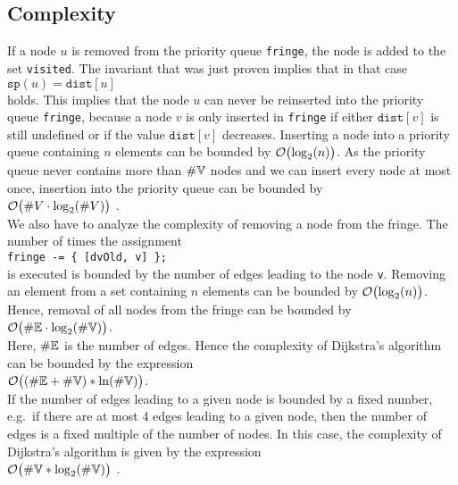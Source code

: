 \subsection{Complexity}
If a node $u$ is removed from the priority queue \texttt{fringe}, the node is added to the set
\texttt{visited}.  The invariant that was just proven implies that in that case
\\[0.2cm]
\hspace*{1.3cm}
$\texttt{sp}(u) = \texttt{dist}[u]$
\\[0.2cm]
holds.  This implies that the node $u$ can never be reinserted into the priority queue
\texttt{fringe}, because a node $v$ is only inserted in \texttt{fringe} if either 
 $\texttt{dist}[v]$ is still undefined or if  the  value $\texttt{dist}[v]$ decreases.  
Inserting a node into a priority queue containing  $n$ elements can be bounded by
$\mathcal{O}\bigl(\log_2(n)\bigr)$.  As the priority queue never contains more than $\#{\mathbb V}$ nodes and we
can insert every node at most once, insertion into the priority queue can be bounded by
\\[0.2cm]
\hspace*{1.3cm}
$\mathcal{O}\bigl(\#V \cdot \log_2(\#V)\bigr)$ .
\\[0.2cm]
We also have to analyze the complexity of removing a node from the fringe. 
The number of times the assignment
\\[0.2cm]
\hspace*{1.3cm}
\texttt{fringe -= \{ [dvOld, v] \};} 
\\[0.2cm]
is executed is bounded by the number of edges leading to the node \texttt{v}.
Removing an element from a set containing $n$ elements can be bounded by
 $\mathcal{O}\bigl(\log_2(n)\bigr)$.  Hence, removal of all nodes from the fringe can be bounded by
\\[0.2cm]
\hspace*{1.3cm}
$\mathcal{O}\bigl(\#{\mathbb E} \cdot \log_2(\#{\mathbb V})\bigr)$.
\\[0.2cm]
Here,  $\#{\mathbb E}$ is the number of edges.  Hence the complexity of Dijkstra's algorithm can be
bounded by the expression \\[0.2cm]
\hspace*{1.3cm} $\mathcal{O}\bigl((\#{\mathbb E} + \#{\mathbb V}) * \ln(\#{\mathbb V})\bigr)$. \\[0.2cm]
If the number of edges leading  to a given node is bounded by a fixed number, e.g.~if there
are at most 4 edges leading to a given node, then the number of edges is a fixed multiple of the
number of nodes.  In this case, the complexity of 
 Dijkstra's algorithm is given by the expression  
\\[0.2cm]
\hspace*{1.3cm}
$\mathcal{O}\bigl(\#{\mathbb V} * \log_2(\#{\mathbb V})\bigr)$ .





